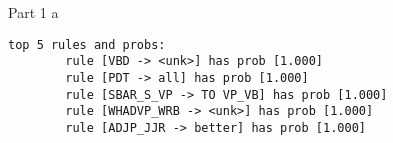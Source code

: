 \documentclass{article}
\begin{document}
Part 1 a
\begin{verbatim}
top 5 rules and probs:
        rule [VBD -> <unk>] has prob [1.000]
        rule [PDT -> all] has prob [1.000]
        rule [SBAR_S_VP -> TO VP_VB] has prob [1.000]
        rule [WHADVP_WRB -> <unk>] has prob [1.000]
        rule [ADJP_JJR -> better] has prob [1.000]
\end{verbatim}
\end{document}
